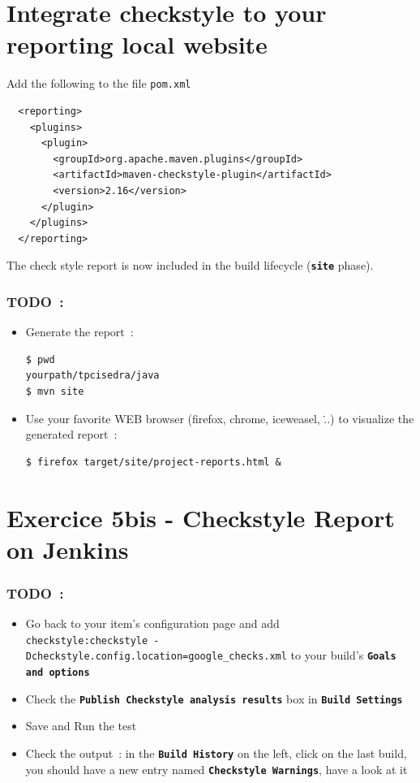 \documentclass{article}
\begin{document}
\section{Integrate checkstyle to your reporting local website}

Add the following to the file \texttt{pom.xml}
\begin{lstlisting}
  <reporting>
    <plugins>
      <plugin>
        <groupId>org.apache.maven.plugins</groupId>
        <artifactId>maven-checkstyle-plugin</artifactId>
        <version>2.16</version>
      </plugin>
    </plugins>
  </reporting>
\end{lstlisting}

The check style report is now included in the build lifecycle (\textbf{\texttt{site}} phase).

\subsubsection{TODO~:}

\begin {itemize}
\item Generate the report~:
\begin{lstlisting}
$ pwd
yourpath/tpcisedra/java
$ mvn site
\end{lstlisting}
\item Use your favorite WEB browser (firefox, chrome, iceweasel, \...) to visualize the generated report~:
\begin{lstlisting}
$ firefox target/site/project-reports.html &
\end{lstlisting}
\end{itemize}

\section{Exercice 5bis - Checkstyle Report on Jenkins}

\subsubsection{TODO~:}
\begin{itemize}
\item Go back to your item's configuration page and add \\
\texttt{checkstyle:checkstyle -Dcheckstyle.config.location=google\_checks.xml} to your build's \textbf{\texttt{Goals and options}}
\item Check the \textbf{\texttt{Publish Checkstyle analysis results}} box in \textbf{\texttt{Build Settings}}
\item Save and Run the test
\item Check the output~: in the \textbf{\texttt{Build History}} on the left, click on the last build, you should have a new entry named \textbf{\texttt{Checkstyle Warnings}}, have a look at it
\end{itemize}
\end{document}
